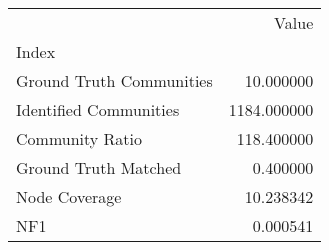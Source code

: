 \begin{tabular}{lr}
\toprule
{} &        Value \\
Index                    &              \\
\midrule
Ground Truth Communities &    10.000000 \\
Identified Communities   &  1184.000000 \\
Community Ratio          &   118.400000 \\
Ground Truth Matched     &     0.400000 \\
Node Coverage            &    10.238342 \\
NF1                      &     0.000541 \\
\bottomrule
\end{tabular}
